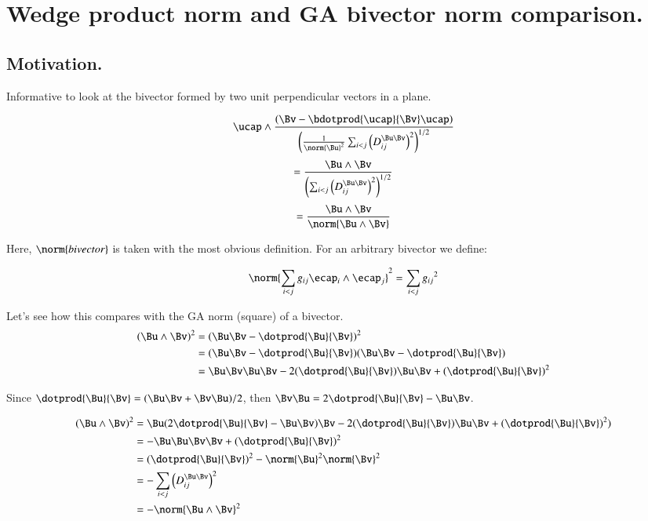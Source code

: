\chapter{Wedge product norm and GA bivector norm comparison.}
\label{chap:wedgeNormVsGaNorm}
\date{Jan 2008 or so.  $RCSfile: wedgeNormVsGaNorm.tex,v $ Last $Revision: 1.9 $ $Date: 2009/08/20 02:24:45 $ }

\section{Motivation.}

Informative to look at the bivector formed by two unit perpendicular vectors in a plane.

\[
\ucap \wedge
\frac{
\left(\Bv - \bdotprod{\ucap}{\Bv} \ucap \right)
}
{
\left(\frac{1}{\norm{\Bu}^2} \sum_{i<j} {\left(D_{ij}^{\Bu \Bv}\right)}^2\right)^{1/2}
}
\]
\[
=
\frac{\Bu \wedge \Bv}
{
{\left(\sum_{i<j} {\left(D_{ij}^{\Bu \Bv}\right)}^2\right)}^{1/2}
}
\]
\[
=
\frac{\Bu \wedge \Bv}
{
\norm{\Bu \wedge \Bv}
}
\]

Here, $\norm{ bivector }$ is taken with the most obvious definition.  For an arbitrary bivector we define:

\[
\norm{\sum_{i<j}g_{ij} \ecap_i \wedge \ecap_j}^2
=
\sum_{i<j}{g_{ij}}^2
\]

Let's see how this compares with the GA norm (square) of a bivector.
\begin{align*}
(\Bu \wedge \Bv)^2 &= (\Bu \Bv - \dotprod{\Bu}{\Bv})^2 \\
                   &= (\Bu \Bv - \dotprod{\Bu}{\Bv})(\Bu \Bv - \dotprod{\Bu}{\Bv}) \\
                   &= \Bu \Bv \Bu \Bv - 2 (\dotprod{\Bu}{\Bv}) \Bu \Bv + {(\dotprod{\Bu}{\Bv})}^2
\end{align*}

Since $\dotprod{\Bu}{\Bv} = (\Bu \Bv + \Bv \Bu)/2$, then
$\Bv \Bu = 2 \dotprod{\Bu}{\Bv} - \Bu \Bv$.

\begin{align*}
(\Bu \wedge \Bv)^2 &= \Bu ( 2 \dotprod{\Bu}{\Bv} - \Bu \Bv ) \Bv - 2 (\dotprod{\Bu}{\Bv})\Bu \Bv + {(\dotprod{\Bu}{\Bv})}^2) \\
                   &= - \Bu \Bu \Bv \Bv + {(\dotprod{\Bu}{\Bv})}^2 \\
                   &= {(\dotprod{\Bu}{\Bv})}^2 - \norm{\Bu}^2 \norm{\Bv}^2 \\
                   &= - \sum_{i<j} {\left(D_{ij}^{\Bu \Bv}\right)}^2 \\
                   &= - \norm{\Bu \wedge \Bv}^2
\end{align*}

